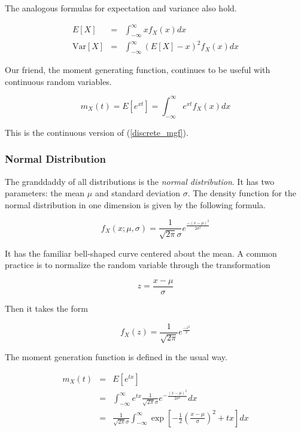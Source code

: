 \documentclass[]{article}
\begin{document}
The analogous formulas for expectation and variance also hold.

\begin{eqnarray}
E[X] & = & \int_{-\infty}^{\infty} xf_X(x) dx \label{cont_mean} \\
\mbox{Var}[X] & = & \int_{-\infty}^{\infty} (E[X] - x)^2 f_X(x) dx \label{cont_var}
\end{eqnarray}

Our friend, the moment generating function, continues to be useful
with continuous random variables.

\begin{equation} \label{cont_mgf}
m_X(t) = E[e^{xt}] = \int_{-\infty}^{\infty} e^{xt} f_X(x) dx
\end{equation}

This is the continuous version of (\ref{discrete_mgf}).

\subsubsection{Normal Distribution}

The granddaddy of all distributions is the \emph{normal distribution}.
It has two parameters: the mean $\mu$ and standard deviation
$\sigma$.  The density function for the normal distribution in one
dimension is given by the following formula.

\begin{equation}
f_X(x; \mu, \sigma) = \frac{1}{\sqrt{2\pi}\sigma}e^{\frac{-(x - \mu)^2}{2\sigma^2}}
\end{equation}

It has the familiar bell-shaped curve centered about the mean.
A common practice is to normalize the random variable through
the transformation

$$
z = \frac{x - \mu}{\sigma}
$$

Then it takes the form

\begin{equation}
f_X(z) = \frac{1}{\sqrt{2\pi}}e^\frac{-z^2}{2}
\end{equation}

The moment generation function is defined in the usual way.

\begin{eqnarray*}
m_X(t) &= &E \left[ e^{tx}\right] \\
  &= &\int_{-\infty}^{\infty} e^{tx} \frac{1}{\sqrt{2\pi}\sigma} 
         e^{-\frac{(x-\mu)^2}{2\sigma^2}} dx \\
  &= &\frac{1}{\sqrt{2\pi} \sigma} \int_{-\infty}^{\infty}
       \exp \left[ -\frac{1}{2} \left( \frac{x-\mu}{\sigma} \right)^2 + tx \right] dx
\end{eqnarray*}
\end{document}
